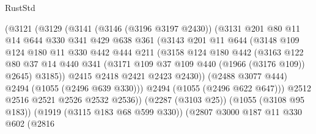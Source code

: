 \begin{lexlean}{RustStd}
\begin{coremodule}
                      (@3121
                        (@3129
                          (@3141
                            (@3146 (@3196 @3197 @2430))
                            (@3131
                              @201
                              @80
                              @11
                              @14
                              @644
                              @330
                              @341
                              @429
                              @638
                              @361
                              (@3143
                                @201
                                @11
                                @644
                                (@3148
                                  @109
                                  @124
                                  @180
                                  @11
                                  @330
                                  @442
                                  @444
                                  @211
                                  (@3158
                                    @124
                                    @180
                                    @442
                                    (@3163
                                      @122
                                      @80
                                      @37
                                      @14
                                      @440
                                      @341
                                      (@3171 @109 @37 @109 @440 (@1966 (@3176 @109)) @2645)
                                      @3185))
                                  @2415
                                  @2418
                                  @2421
                                  @2423
                                  @2430))
                              (@2488 @3077 @444)
                              @2494
                              (@1055 (@2496 @639 @330)))
                            @2494
                            (@1055 (@2496 @622 @647)))
                          @2512
                          @2516
                          @2521
                          @2526
                          @2532
                          @2536))
                      (@2287 (@3103 @25))
                      (@1055 (@3108 @95 @183))
                      (@1919 (@3115 @183 @68 @599 @330))
                      (@2807
                        @3000
                        @187
                        @11
                        @330
                        @602
                        (@2816

\end{coremodule}
\end{lexlean}

